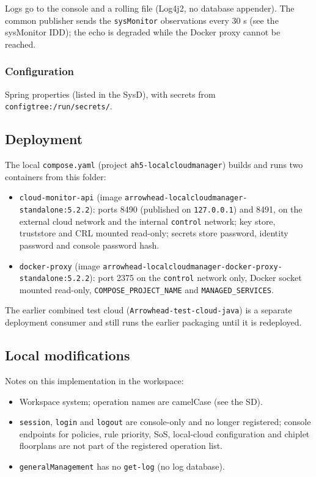 \documentclass[a4paper]{arrowhead}
\begin{document}
Logs go to the console and a rolling file (Log4j2, no database appender). The common publisher sends the \texttt{sysMonitor} observations every 30 s (see the sysMonitor IDD); the echo is degraded while the Docker proxy cannot be reached.

\subsubsection{Configuration}

Spring properties (listed in the SysD), with secrets from \texttt{configtree:\allowbreak{}/\allowbreak{}run/\allowbreak{}secrets/}.

\subsection{Deployment}

The local \texttt{compose.yaml} (project \texttt{ah5-\allowbreak{}localcloudmanager}) builds and runs two containers from this folder:

\begin{itemize}
\item \texttt{cloud-\allowbreak{}monitor-\allowbreak{}api} (image \texttt{arrowhead-\allowbreak{}localcloudmanager-\allowbreak{}standalone:\allowbreak{}5.2.2}): ports 8490 (published on \texttt{127.0.0.1}) and 8491, on the external cloud network and the internal \texttt{control} network; key store, truststore and CRL mounted read-only; secrets store password, identity password and console password hash.
\item \texttt{docker-\allowbreak{}proxy} (image \texttt{arrowhead-\allowbreak{}localcloudmanager-\allowbreak{}docker-\allowbreak{}proxy-\allowbreak{}standalone:\allowbreak{}5.2.2}): port 2375 on the \texttt{control} network only, Docker socket mounted read-only, \texttt{COMPOSE\_\allowbreak{}PROJECT\_\allowbreak{}NAME} and \texttt{MANAGED\_\allowbreak{}SERVICES}.
\end{itemize}

The earlier combined test cloud (\texttt{Arrowhead-test-cloud-java}) is a separate deployment consumer and still runs the earlier packaging until it is redeployed.

\subsection{Local modifications}
\label{sec:local}

Notes on this implementation in the workspace:
\begin{itemize}
  \item Workspace system; operation names are camelCase (see the SD).
  \item \texttt{session}, \texttt{login} and \texttt{logout} are console-only and no longer registered; console endpoints for policies, rule priority, SoS, local-cloud configuration and chiplet floorplans are not part of the registered operation list.
  \item \texttt{general\allowbreak{}Management} has no \texttt{get-\allowbreak{}log} (no log database).
\end{itemize}
\end{document}
